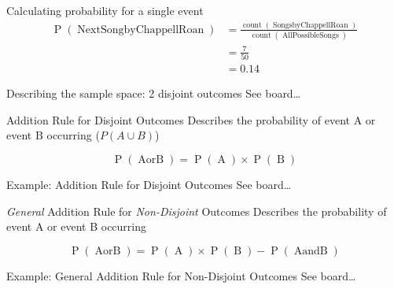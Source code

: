 \documentclass[
  ignorenonframetext,
]{beamer}
\begin{document}
\begin{frame}{Calculating probability for a single event}
\label{calculating-probability-for-a-single-event}
\[
\begin{aligned}
\operatorname{P}(\operatorname{Next Song by Chappell Roan})&=\frac{\operatorname{count}(\operatorname{Songs by Chappell Roan})}{\operatorname{count}(\operatorname{All Possible Songs})} \\
&= \frac{7}{50} \\
&= 0.14
\end{aligned}
\]
\end{frame}

\begin{frame}{Describing the sample space: 2 disjoint outcomes}
\label{describing-the-sample-space-2-disjoint-outcomes}
See board\ldots{}
\end{frame}

\begin{frame}{Addition Rule for Disjoint Outcomes}
\label{addition-rule-for-disjoint-outcomes}
Describes the probability of event A or event B occurring
(\(P(A \cup B)\))

\[\operatorname{P}(\operatorname{A or B}) = \operatorname{P}(\operatorname{A}) \times \operatorname{P}(\operatorname{B})\]
\end{frame}

\begin{frame}{Example: Addition Rule for Disjoint Outcomes}
\label{example-addition-rule-for-disjoint-outcomes}
See board\ldots{}
\end{frame}

\begin{frame}{\emph{General} Addition Rule for \emph{Non-Disjoint}
Outcomes}
\label{general-addition-rule-for-non-disjoint-outcomes}
Describes the probability of event A or event B occurring

\[\operatorname{P}(\operatorname{A or B}) = \operatorname{P}(\operatorname{A}) \times \operatorname{P}(\operatorname{B}) - \operatorname{P}(\operatorname{A and B})\]
\end{frame}

\begin{frame}{Example: General Addition Rule for Non-Disjoint Outcomes}
\label{example-general-addition-rule-for-non-disjoint-outcomes}
See board\ldots{}
\end{frame}
\end{document}

